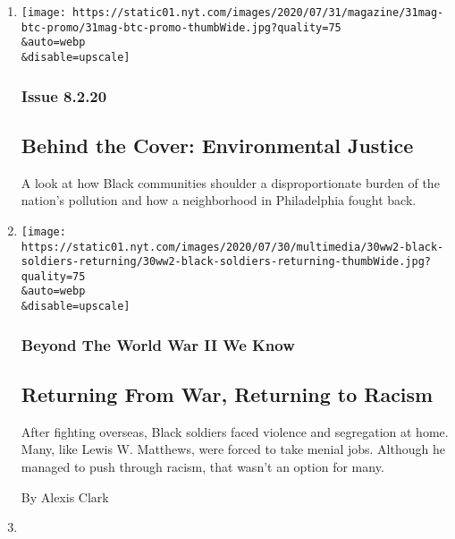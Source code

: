 \begin{enumerate}
\def\labelenumi{\arabic{enumi}.}
\item
  \href{/2020/07/31/magazine/behind-the-cover-environmental-justice.html}{}

  \texttt{[image: https://static01.nyt.com/images/2020/07/31/magazine/31mag-btc-promo/31mag-btc-promo-thumbWide.jpg?quality=75\\\&auto=webp\\\&disable=upscale]}

  \hypertarget{issue-8220}{%
  \subsubsection{Issue 8.2.20}\label{issue-8220}}

  \hypertarget{behind-the-cover-environmental-justice}{%
  \subsection{Behind the Cover: Environmental
  Justice}\label{behind-the-cover-environmental-justice}}

  A look at how Black communities shoulder a disproportionate burden of
  the nation's pollution and how a neighborhood in Philadelphia fought
  back.
\item
  \href{/2020/07/30/magazine/black-soldiers-wwii-racism.html}{}

  \texttt{[image: https://static01.nyt.com/images/2020/07/30/multimedia/30ww2-black-soldiers-returning/30ww2-black-soldiers-returning-thumbWide.jpg?quality=75\\\&auto=webp\\\&disable=upscale]}

  \hypertarget{beyond-the-world-war-ii-we-know}{%
  \subsubsection{Beyond The World War II We
  Know}\label{beyond-the-world-war-ii-we-know}}

  \hypertarget{returning-from-war-returning-to-racism}{%
  \subsection{Returning From War, Returning to
  Racism}\label{returning-from-war-returning-to-racism}}

  After fighting overseas, Black soldiers faced violence and segregation
  at home. Many, like Lewis W. Matthews, were forced to take menial
  jobs. Although he managed to push through racism, that wasn't an
  option for many.

  By Alexis Clark
\item
  \href{/2020/07/30/magazine/poem-beatific.html}{}


\end{enumerate}
